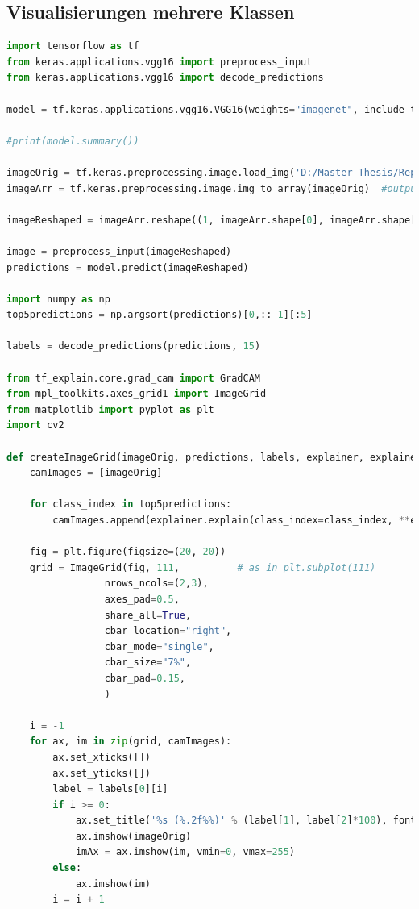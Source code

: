 \documentclass[
  12pt, %
  a4paper, %
  oneside, %
  openany, 
  numbers=noenddot, %
  BCOR=5mm, %
  parskip=half*, %
  thesis, %
]{bfhbook}
\begin{document}
\subsection{Visualisierungen mehrere Klassen}
\label{multiClass}
\begin{lstlisting}[language=Python, caption=Visualisierungen der fünf wahrscheinlichsten Klassen mit verschiedenen Verfahren]
import tensorflow as tf
from keras.applications.vgg16 import preprocess_input
from keras.applications.vgg16 import decode_predictions

model = tf.keras.applications.vgg16.VGG16(weights="imagenet", include_top=True)

#print(model.summary())

imageOrig = tf.keras.preprocessing.image.load_img('D:/Master Thesis/Repo/Test Images/tabby.2.JPG', target_size=(224, 224))
imageArr = tf.keras.preprocessing.image.img_to_array(imageOrig)  #output Numpy-array

imageReshaped = imageArr.reshape((1, imageArr.shape[0], imageArr.shape[1], imageArr.shape[2]))

image = preprocess_input(imageReshaped)
predictions = model.predict(imageReshaped)

import numpy as np
top5predictions = np.argsort(predictions)[0,::-1][:5]

labels = decode_predictions(predictions, 15)

from tf_explain.core.grad_cam import GradCAM
from mpl_toolkits.axes_grid1 import ImageGrid
from matplotlib import pyplot as plt
import cv2

def createImageGrid(imageOrig, predictions, labels, explainer, explainerArgs):
    camImages = [imageOrig]

    for class_index in top5predictions:
        camImages.append(explainer.explain(class_index=class_index, **explainerArgs))
    
    fig = plt.figure(figsize=(20, 20))
    grid = ImageGrid(fig, 111,          # as in plt.subplot(111)
                 nrows_ncols=(2,3),
                 axes_pad=0.5,
                 share_all=True,
                 cbar_location="right",
                 cbar_mode="single",
                 cbar_size="7%",
                 cbar_pad=0.15,
                 )
    
    i = -1
    for ax, im in zip(grid, camImages):
        ax.set_xticks([])
        ax.set_yticks([])
        label = labels[0][i]
        if i >= 0:
            ax.set_title('%s (%.2f%%)' % (label[1], label[2]*100), fontsize=20)
            ax.imshow(imageOrig)
            imAx = ax.imshow(im, vmin=0, vmax=255)
        else:
            ax.imshow(im)
        i = i + 1


\end{lstlisting}
\end{document}
